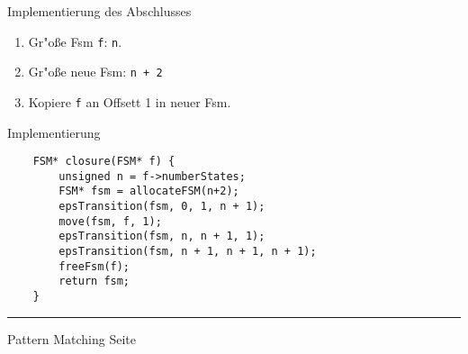 \begin{slide}{}
\normalsize

\begin{center}
Implementierung des Abschlusses
\end{center}
\vspace*{0.5cm}

\footnotesize
\hspace*{-1cm}

\begin{enumerate}
\item Gr"o{\ss}e Fsm \texttt{f}: \texttt{n}.
\item Gr"o{\ss}e neue Fsm: \texttt{n + 2}
\item Kopiere \texttt{f} an Offsett 1 in neuer Fsm.
\end{enumerate}

Implementierung
\begin{verbatim}
    FSM* closure(FSM* f) {
        unsigned n = f->numberStates;
        FSM* fsm = allocateFSM(n+2);
        epsTransition(fsm, 0, 1, n + 1);
        move(fsm, f, 1);
        epsTransition(fsm, n, n + 1, 1);
        epsTransition(fsm, n + 1, n + 1, n + 1);
        freeFsm(f);
        return fsm;
    }
\end{verbatim}


\vspace*{\fill}
\tiny \addtocounter{mypage}{1}
\rule{17cm}{1mm}
Pattern Matching \hspace*{\fill} Seite 
\end{slide}


